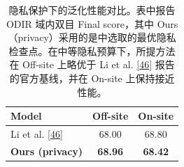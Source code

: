 \begin{table}[!htb]
\centering
\caption{隐私保护下的泛化性能对比。表中报告 ODIR 域内双目 Final score，其中 Ours（privacy）采用的是中选取的最优隐私检查点。在中等隐私预算下，所提方法在 Off-site 上略优于 Li et al. \hyperref[_Ref213949402]{{[}46{]}} 报告的官方基线，并在 On-site 上保持接近性能。}
\label{tab:privacy-final}
\begin{tabular}{lcc}
\toprule
Model & Off-site & On-site \\
\midrule
Li et al. \hyperref[_Ref213949402]{{[}46{]}} & 68.00 & 68.80 \\
\textbf{Ours (privacy)} & \textbf{68.96} & \textbf{68.42} \\
\bottomrule
\end{tabular}
\end{table}
